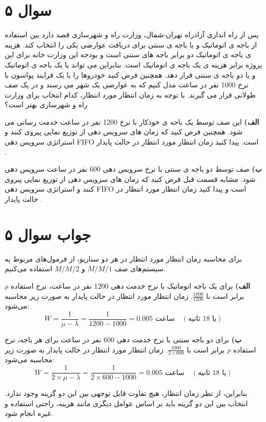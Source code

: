 \section*{سوال ۵}

پس از راه اندازی آزادراه تهران-شمال، وزارت راه و شهرسازی قصد دارد بین استفاده از باجه ی اتوماتیک و یا باجه ی سنتی برای دریافت عوارضی یکی را انتخاب کند. هزینه ی باجه ی اتوماتیک دو برابر باجه های سنتی است و بودجه این وزارت خانه برای این پروژه برابر هزینه ی یک باجه ی اتوماتیک است. بنابراین می تواند یا یک باجه ی اتوماتیک و یا دو باجه ی سنتی قرار دهد. همچنین فرض کنید خودروها را با یک فرایند پواسون با نرخ 1000 نفر در ساعت مدل کنیم که به عوارضی یک شهر می رسند و در یک صف طولانی قرار می گیرند. با توجه به زمان انتظار مورد انتظار، کدام انتخاب برای وزارت راه و شهرسازی بهتر است؟

\textbf{الف)} این صف توسط یک باجه ی خودکار با نرخ 1200 نفر در ساعت خدمت رسانی می شود. همچنین فرض کنید که زمان های سرویس دهی از توزیع نمایی پیروی کنند و استراتژی سرویس دهی FIFO است. پیدا کنید زمان انتظار مورد انتظار در حالت پایدار 
.

\textbf{ب)} صف توسط دو باجه ی سنتی با نرخ سرویس دهی 600 نفر در ساعت سرویس دهی شود. مشابه قسمت قبل فرض کنید که زمان های سرویس دهی از توزیع نمایی پیروی کنند و استراتژی سرویس دهی FIFO است و پیدا کنید زمان انتظار مورد انتظار در حالت پایدار 
.

\section*{جواب سوال ۵}

برای محاسبه زمان انتظار مورد انتظار در هر دو سناریو، از فرمول‌های مربوط به سیستم‌های صف 
$M/M/1$
 و
$M/M/2$
  استفاده می‌کنیم.

\textbf{الف)} برای یک باجه اتوماتیک با نرخ خدمت دهی \(1200\) نفر در ساعت، نرخ استفاده \(\rho\) برابر است با \(\frac{1000}{1200}\). زمان انتظار مورد انتظار در حالت پایدار به صورت زیر محاسبه می‌شود:
\[
W = \frac{1}{\mu - \lambda} = \frac{1}{1200 - 1000} = 0.005 \text{ ساعت} \quad (\text{یا 18 ثانیه})
\]

\textbf{ب)} برای دو باجه سنتی با نرخ خدمت دهی \(600\) نفر در ساعت برای هر باجه، نرخ استفاده \(\rho\) برابر است با \(\frac{1000}{2 \times 600}\). زمان انتظار مورد انتظار در حالت پایدار به صورت زیر محاسبه می‌شود:
\[
W = \frac{1}{2 \times \mu - \lambda} = \frac{1}{2 \times 600 - 1000} = 0.005 \text{ ساعت} \quad (\text{یا 18 ثانیه})
\]

بنابراین، از نظر زمان انتظار، هیچ تفاوت قابل توجهی بین این دو گزینه وجود ندارد. انتخاب بین این دو گزینه باید بر اساس عوامل دیگری مانند هزینه، راحتی استفاده و غیره انجام شود.